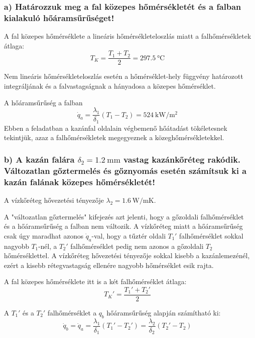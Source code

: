 \subsubsection*{a) Határozzuk meg a fal közepes hőmérsékletét és a falban kialakuló hőáramsűrűséget!}

A fal közepes hőmérséklete a lineáris hőmérsékleteloszlás miatt a falhőmérsékletek átlaga:
\begin{equation}
	T_K = \frac{T_1 + T_2}{2} = \SI{297.5}{\celsius}
\end{equation}

Nem lineáris hőmérsékleteloszlás esetén a hőmérséklet-hely függvény határozott integráljának és a falvastagságnak a hányadosa a közepes hőmérséklet.

A hőáramsűrűség a falban
\begin{equation}
	\dot{q}_a = \frac{\lambda_1}{\delta_1} (T_1 - T_2) = \SI{524}{\kilo\watt\per\meter\squared}
\end{equation}
Ebben a feladatban a kazánfal oldalain végbemenő hőátadást tökéletesnek tekintjük, azaz a falhőmérsékletek megegyeznek a közeghőmérsékletekkel.

\subsubsection*{b) A kazán falára $\delta_2 = \SI{1.2}{\milli\meter}$ vastag kazánkőréteg rakódik. Változatlan gőztermelés és gőznyomás esetén számítsuk ki a kazán falának közepes hőmérsékletét!}

A vízkőréteg hővezetési tényezője $\lambda_2 = \SI{1.6}{\watt\per\meter\kelvin}$.

\vspace{2mm}

A "változatlan gőztermelés" kifejezés azt jelenti, hogy a gőzoldali falhőmérséklet és a hőáramsűrűség a falban nem változik. A vízkőréteg miatt a hőáramsűrűség csak úgy maradhat azonos $\dot{q}_a$-val, hogy a tűztér oldali $T_1'$ falhőmérséklet sokkal nagyobb $T_1$-nél, a $T_2'$ falhőmérséklet pedig nem azonos a gőzoldali $T_2$ hőmérséklettel. A vízkőréteg hővezetési tényezője sokkal kisebb a kazánlemezénél, ezért a kisebb rétegvastagság ellenére nagyobb hőmérséklet esik rajta.

A fal közepes hőmérséklete itt is a két falhőmérséklet átlaga:
\begin{equation}
	T_K' = \frac{T_1' + T_2'}{2}
\end{equation}

A $T_1'$ és a $T_2'$ falhőmérséklet a $q_b$ hőáramsűrűség alapján számítható ki:
\begin{equation}
	\dot{q}_b = \dot{q}_a = \frac{\lambda_1}{\delta_1} (T_1' - T_2') = \frac{\lambda_2}{\delta_2} (T_2' - T_2)
\end{equation}

